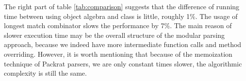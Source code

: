 The right part of table \ref{tab:comparison} suggests that the difference of running time between
using object algebra and class is little, roughly 1\%.
The usage of longest match combinator slows the performance by 7\%. The main reason of slower
execution time may be the overall structure of the modular parsing approach, because we indeed have
more intermediate function calls and method overriding. However, it is worth mentioning that
because of the memoization technique of Packrat parsers, we are only constant times
slower, the algorithmic complexity is still the same.
